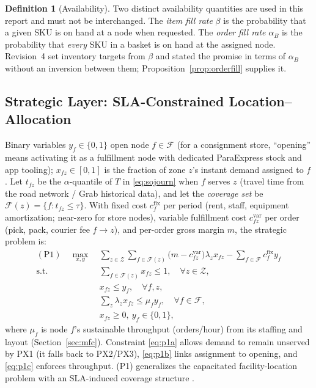 \documentclass[10pt,twocolumn,letterpaper]{article}
\theoremstyle{definition}
\newtheorem{definition}{Definition}
\begin{document}
\begin{definition}[Availability]\label{def:avail}
Two distinct availability quantities are used in this report and must not be interchanged. The \emph{item fill rate} $\beta$ is the probability that a given SKU is on hand at a node when requested. The \emph{order fill rate} $\alpha_B$ is the probability that \emph{every} SKU in a basket is on hand at the assigned node. Revision~4 set inventory targets from $\beta$ and stated the promise in terms of $\alpha_B$ without an inversion between them; Proposition~\ref{prop:orderfill} supplies it.
\end{definition}

\subsection{Strategic Layer: SLA-Constrained Location--Allocation}

Binary variables $y_f\in\{0,1\}$ open node $f\in\mathcal{F}$ (for a consignment store, ``opening'' means activating it as a fulfillment node with dedicated ParaExpress stock and app tooling); $x_{fz}\in[0,1]$ is the fraction of zone $z$'s instant demand assigned to $f$. Let $t_{fz}$ be the $\alpha$-quantile of $T$ in \eqref{eq:sojourn} when $f$ serves $z$ (travel time from the road network / Grab historical data), and let the \emph{coverage set} be $\mathcal{F}(z)=\{f: t_{fz}\le\tau\}$. With fixed cost $c^{\mathrm{fix}}_f$ per period (rent, staff, equipment amortization; near-zero for store nodes), variable fulfillment cost $c^{\mathrm{var}}_{fz}$ per order (pick, pack, courier fee $f\to z$), and per-order gross margin $m$, the strategic problem is:
\begin{align}
(\mathrm{P1})\quad \max_{x,y}\ &\sum_{z\in\mathcal{Z}}\sum_{f\in\mathcal{F}(z)}\bigl(m-c^{\mathrm{var}}_{fz}\bigr)\lambda_z x_{fz}-\sum_{f\in\mathcal{F}}c^{\mathrm{fix}}_f y_f \label{eq:p1}\\
\text{s.t.}\ &\textstyle\sum_{f\in\mathcal{F}(z)}x_{fz}\le 1,\quad \forall z\in\mathcal{Z},\label{eq:p1a}\\
&x_{fz}\le y_f,\quad \forall f,z,\label{eq:p1b}\\
&\textstyle\sum_z\lambda_zx_{fz}\le\mu_fy_f,\quad\forall f\in\mathcal{F},\label{eq:p1c}\\
&x_{fz}\ge 0,\ y_f\in\{0,1\},\nonumber
\end{align}
where $\mu_f$ is node $f$'s sustainable throughput (orders/hour) from its staffing and layout (Section~\ref{sec:mfc}). Constraint \eqref{eq:p1a} allows demand to remain unserved by PX1 (it falls back to PX2/PX3), \eqref{eq:p1b} links assignment to opening, and \eqref{eq:p1c} enforces throughput. (P1) generalizes the capacitated facility-location problem \cite{daskin2013,melo2009} with an SLA-induced coverage structure \cite{church1974}.
\end{document}
